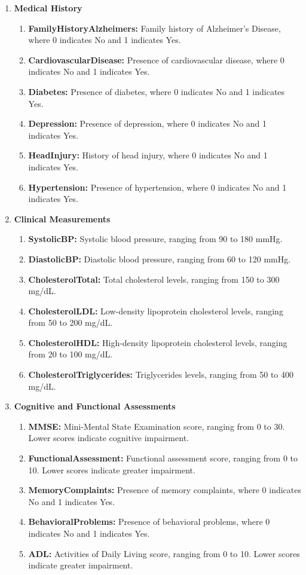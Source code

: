\documentclass[a4paper,12pt]{report}
\begin{document}
\begin {enumerate}
\item\textbf{Medical History}
\begin {enumerate}[label=\roman*]
    \item \textbf{FamilyHistoryAlzheimers:} Family history of Alzheimer's Disease, where 0 indicates No and 1 indicates Yes.
    \item \textbf{CardiovascularDisease:} Presence of cardiovascular disease, where 0 indicates No and 1 indicates Yes.
    \item \textbf{Diabetes:} Presence of diabetes, where 0 indicates No and 1 indicates Yes.
    \item \textbf{Depression:} Presence of depression, where 0 indicates No and 1 indicates Yes.
    \item \textbf{HeadInjury:} History of head injury, where 0 indicates No and 1 indicates Yes.
    \item \textbf{Hypertension:} Presence of hypertension, where 0 indicates No and 1 indicates Yes.
\end{enumerate}

\item\textbf{Clinical Measurements}
\begin {enumerate}[label=\roman*]
    \item \textbf{SystolicBP:} Systolic blood pressure, ranging from 90 to 180 mmHg.
    \item \textbf{DiastolicBP:} Diastolic blood pressure, ranging from 60 to 120 mmHg.
    \item \textbf{CholesterolTotal:} Total cholesterol levels, ranging from 150 to 300 mg/dL.
    \item \textbf{CholesterolLDL:} Low-density lipoprotein cholesterol levels, ranging from 50 to 200 mg/dL.
    \item \textbf{CholesterolHDL:} High-density lipoprotein cholesterol levels, ranging from 20 to 100 mg/dL.
    \item \textbf{CholesterolTriglycerides:} Triglycerides levels, ranging from 50 to 400 mg/dL.
\end{enumerate}

\item\textbf{Cognitive and Functional Assessments}
\begin {enumerate}[label=\roman*]
    \item \textbf{MMSE:} Mini-Mental State Examination score, ranging from 0 to 30. Lower scores indicate cognitive impairment.
    \item \textbf{FunctionalAssessment:} Functional assessment score, ranging from 0 to 10. Lower scores indicate greater impairment.
    \item \textbf{MemoryComplaints:} Presence of memory complaints, where 0 indicates No and 1 indicates Yes.
    \item \textbf{BehavioralProblems:} Presence of behavioral problems, where 0 indicates No and 1 indicates Yes.
    \item \textbf{ADL:} Activities of Daily Living score, ranging from 0 to 10. Lower scores indicate greater impairment.
\end{enumerate}


\end{enumerate}
\end{document}
